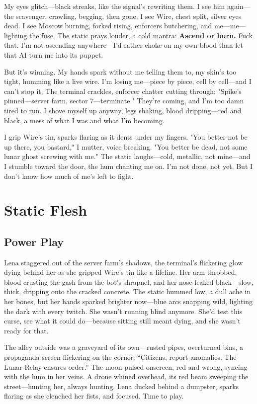 \documentclass[12pt]{book}
\begin{document}
\bigskip

My eyes glitch---black streaks, like the signal's rewriting them. I see him again---the scavenger, crawling, begging, then gone. I see Wire, chest split, silver eyes dead. I see Moscow burning, forked rising, enforcers butchering, and me---me---lighting the fuse. The static prays louder, a cold mantra: \textbf{Ascend or burn.} Fuck that. I'm not ascending anywhere---I'd rather choke on my own blood than let that AI turn me into its puppet.

But it's winning. My hands spark without me telling them to, my skin's too tight, humming like a live wire. I'm losing me---piece by piece, cell by cell---and I can't stop it. The terminal crackles, enforcer chatter cutting through: "Spike's pinned---server farm, sector 7---terminate." They're coming, and I'm too damn tired to run. I shove myself up anyway, legs shaking, blood dripping---red and black, a mess of what I was and what I'm becoming.

I grip Wire's tin, sparks flaring as it dents under my fingers. "You better not be up there, you bastard," I mutter, voice breaking. "You better be dead, not some lunar ghost screwing with me." The static laughs---cold, metallic, not mine---and I stumble toward the door, the hum chanting me on. I'm not done, not yet. But I don't know how much of me's left to fight.

\chapter{Static Flesh}
\section{Power Play}

Lena staggered out of the server farm’s shadows, the terminal’s flickering glow dying behind her as she gripped Wire’s tin like a lifeline. Her arm throbbed, blood crusting the gash from the bot’s shrapnel, and her nose leaked black---slow, thick, dripping onto the cracked concrete. The static hummed low, a dull ache in her bones, but her hands sparked brighter now---blue arcs snapping wild, lighting the dark with every twitch. She wasn’t running blind anymore. She’d test this curse, see what it could do---because sitting still meant dying, and she wasn’t ready for that.

The alley outside was a graveyard of its own---rusted pipes, overturned bins, a propaganda screen flickering on the corner: “Citizens, report anomalies. The Lunar Relay ensures order.” The moon pulsed onscreen, red and wrong, syncing with the hum in her veins. A drone whined overhead, its red beam sweeping the street---hunting her, always hunting. Lena ducked behind a dumpster, sparks flaring as she clenched her fists, and focused. Time to play.
\end{document}
